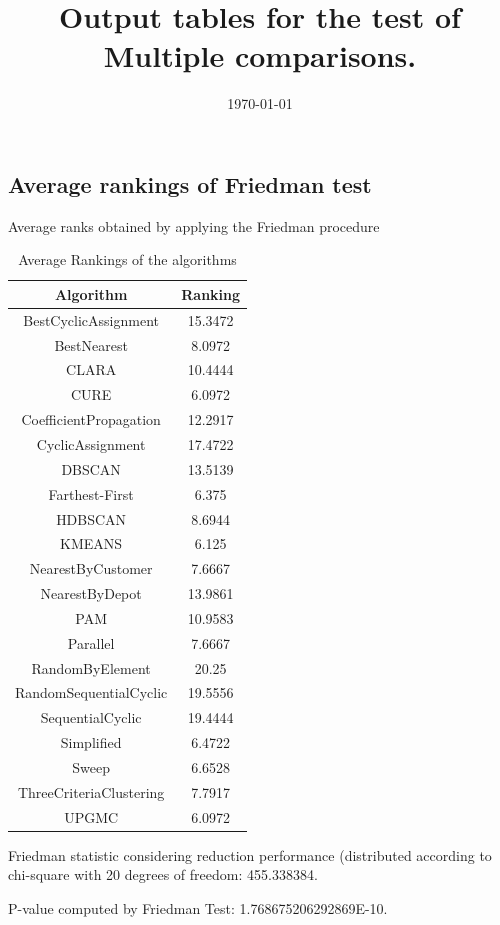 \documentclass[a4paper,10pt]{article}
\title{Output tables for the test of Multiple comparisons.}
\author{}
\date{\today}
\begin{document}
\begin{landscape}
\pagestyle{empty}
\maketitle
\thispagestyle{empty}
\section{Average rankings of Friedman test}



Average ranks obtained by applying the Friedman procedure

\begin{table}[!htp]
\centering
\begin{tabular}{|c|c|}\hline
Algorithm&Ranking\\\hline
BestCyclicAssignment & 15.3472\\
BestNearest & 8.0972\\
CLARA & 10.4444\\
CURE & 6.0972\\
CoefficientPropagation & 12.2917\\
CyclicAssignment & 17.4722\\
DBSCAN & 13.5139\\
Farthest-First & 6.375\\
HDBSCAN & 8.6944\\
KMEANS & 6.125\\
NearestByCustomer & 7.6667\\
NearestByDepot & 13.9861\\
PAM & 10.9583\\
Parallel & 7.6667\\
RandomByElement & 20.25\\
RandomSequentialCyclic & 19.5556\\
SequentialCyclic & 19.4444\\
Simplified & 6.4722\\
Sweep & 6.6528\\
ThreeCriteriaClustering & 7.7917\\
UPGMC & 6.0972\\
\hline
\end{tabular}
\caption{Average Rankings of the algorithms}
\end{table}

Friedman statistic considering reduction performance (distributed according to chi-square with 20 degrees of freedom: 455.338384.

P-value computed by Friedman Test: 1.768675206292869E-10.\newline


\end{landscape}
\end{document}
